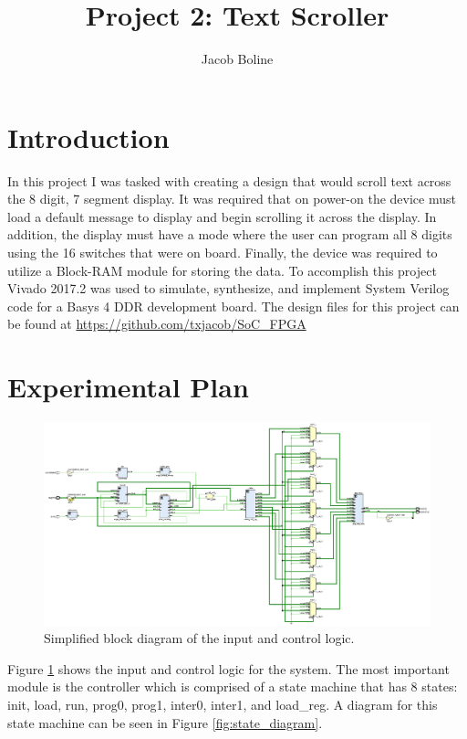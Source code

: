 \documentclass[11pt]{article}
\title{Project 2: Text Scroller}
\author{Jacob Boline}
\begin{document}
\maketitle

\section{Introduction}
In this project I was tasked with creating a design that would scroll text across the 8 digit, 7 segment display. It was required that on power-on the device must load a default message to display and begin scrolling it across the display. In addition, the display must have a mode where the user can program all 8 digits using the 16 switches that were on board. Finally, the device was required to utilize a Block-RAM module for storing the data.  To accomplish this project Vivado 2017.2 was used to simulate, synthesize, and implement System Verilog code for a Basys 4 DDR development board. The design files for this project can be found at \url{https://github.com/txjacob/SoC_FPGA}

\section{Experimental Plan}
\begin{figure}[H]
\includegraphics[trim={0.35cm 6.5cm 11cm 2.75cm}, clip, width=7 in]{./figures/schematic.eps}
	\centering
	\caption{Simplified block diagram of the input and control logic.}
	\label{fig:input_logic}
\end{figure}

Figure \ref{fig:input_logic} shows the input and control logic for the system. The most important module is the controller which is comprised of a state machine that has 8 states: init, load, run, prog0, prog1, inter0, inter1, and load\_reg. A diagram for this state machine can be seen in Figure \ref{fig:state_diagram}. 
\end{document}
